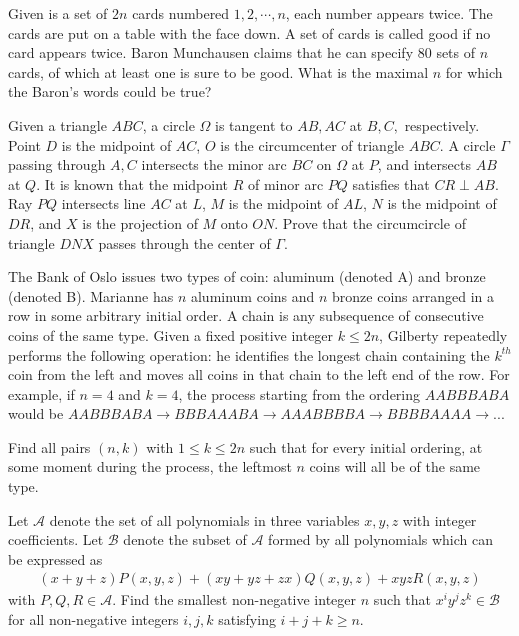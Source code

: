 \documentclass[11pt]{scrartcl}
\begin{document}
\begin{problem}[2989958142304279488]
Given is a set of $2n$ cards numbered $1,2, \cdots, n$, each number appears twice. The cards are put on a table with the face down. A set of cards is called good if no card appears twice. Baron Munchausen claims that he can specify $80$ sets of $n$ cards, of which at least one is sure to be good. What is the maximal $n$ for which the Baron's words could be true?
\end{problem}
\begin{problem}[1222382895728709073]
	Given a triangle $ABC$, a circle $\Omega$ is tangent to $AB,AC$ at $B,C,$ respectively. Point $D$ is the midpoint of $AC$, $O$ is the circumcenter of triangle $ABC$. A circle $\Gamma$ passing through $A,C$ intersects the minor arc $BC$ on $\Omega$ at $P$, and intersects $AB$ at $Q$. It is known that the midpoint $R$ of minor arc $PQ$ satisfies that $CR \perp AB$. Ray $PQ$ intersects line $AC$ at $L$, $M$ is the midpoint of $AL$, $N$ is the midpoint of $DR$, and $X$ is the projection of $M$ onto $ON$. Prove that the circumcircle of triangle $DNX$ passes through the center of $\Gamma$.
\end{problem}
\begin{problem}[587866144613888]
The Bank of Oslo issues two types of coin: aluminum (denoted A) and bronze (denoted B). Marianne has $n$ aluminum coins and $n$ bronze coins arranged in a row in some arbitrary initial order. A chain is any subsequence of consecutive coins of the same type. Given a fixed positive integer $k \leq 2n$, Gilberty repeatedly performs the following operation: he identifies the longest chain containing the $k^{th}$ coin from the left and moves all coins in that chain to the left end of the row. For example, if $n=4$ and $k=4$, the process starting from the ordering $AABBBABA$ would be $AABBBABA \to BBBAAABA \to AAABBBBA \to BBBBAAAA \to ...$

Find all pairs $(n,k)$ with $1 \leq k \leq 2n$ such that for every initial ordering, at some moment during the process, the leftmost $n$ coins will all be of the same type.
\end{problem}
\begin{problem}[712971117639738]
Let $\mathcal{A}$ denote the set of all polynomials in three variables $x, y, z$ with integer coefficients. Let $\mathcal{B}$ denote the subset of $\mathcal{A}$ formed by all polynomials which can be expressed as
\begin{align*}
(x + y + z)P(x, y, z) + (xy + yz + zx)Q(x, y, z) + xyzR(x, y, z)
\end{align*}with $P, Q, R \in \mathcal{A}$. Find the smallest non-negative integer $n$ such that $x^i y^j z^k \in \mathcal{B}$ for all non-negative integers $i, j, k$ satisfying $i + j + k \geq n$.
\end{problem}
\end{document}
